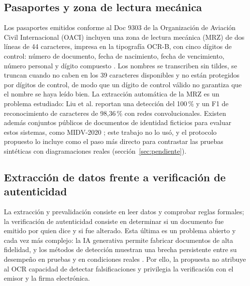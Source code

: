 \documentclass[11pt,a4paper]{article}
\begin{document}
\subsection{Pasaportes y zona de lectura mecánica}
Los pasaportes emitidos conforme al Doc 9303 de la Organización de Aviación Civil Internacional (OACI) incluyen una zona de lectura mecánica (MRZ) de dos líneas de 44 caracteres, impresa en la tipografía OCR-B, con cinco dígitos de control: número de documento, fecha de nacimiento, fecha de vencimiento, número personal y dígito compuesto \cite{icao9303}. Los nombres se transcriben sin tildes, se truncan cuando no caben en los 39 caracteres disponibles y no están protegidos por dígitos de control, de modo que un dígito de control válido no garantiza que el nombre se haya leído bien. La extracción automática de la MRZ es un problema estudiado: Liu et al. \cite{liu2021} reportan una detección del 100\,\% y un F1 de reconocimiento de caracteres de 98,36\,\% con redes convolucionales. Existen además conjuntos públicos de documentos de identidad ficticios para evaluar estos sistemas, como MIDV-2020 \cite{bulatov2022}; este trabajo no lo usó, y el protocolo propuesto lo incluye como el paso más directo para contrastar las pruebas sintéticas con diagramaciones reales (sección~\ref{sec:pendiente}).

\subsection{Extracción de datos frente a verificación de autenticidad}
La extracción y prevalidación consiste en leer datos y comprobar reglas formales; la verificación de autenticidad consiste en determinar si un documento fue emitido por quien dice y si fue alterado. Esta última es un problema abierto y cada vez más complejo: la IA generativa permite fabricar documentos de alta fidelidad, y los métodos de detección muestran una brecha persistente entre su desempeño en pruebas y en condiciones reales \cite{das2026}. Por ello, la propuesta no atribuye al OCR capacidad de detectar falsificaciones y privilegia la verificación con el emisor y la firma electrónica.
\end{document}
